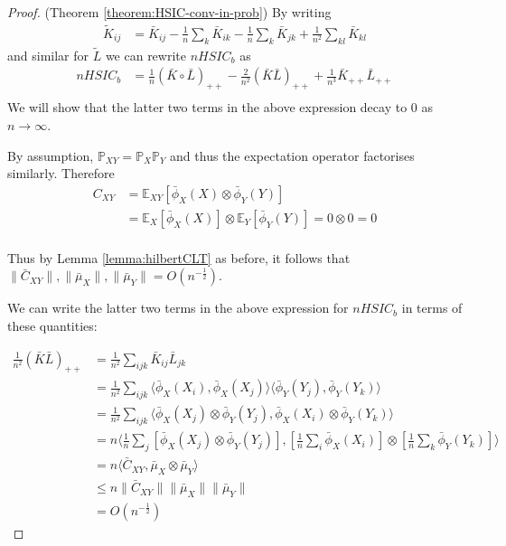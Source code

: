 \documentclass[]{article}
\begin{document}
\begin{proof}(Theorem \ref{theorem:HSIC-conv-in-prob})
By writing
\begin{align*}
\tilde{K}_{ij} &= \bar{K}_{ij} - \frac{1}{n}\sum_k\bar{K}_{ik} - \frac{1}{n}\sum_k\bar{K}_{jk} + \frac{1}{n^2}\sum_{kl}\bar{K}_{kl}
\end{align*} 
and similar for $\tilde{L}$ we can rewrite $nHSIC_b$ as 
\begin{align*}
nHSIC_b & = \frac{1}{n} (\bar{K}\circ \bar{L})_{++}  - \frac{2}{n^2}(\bar{K}\bar{L})_{++} + \frac{1}{n^3}\bar{K}_{++}\bar{L}_{++} \\
\end{align*}
We will show that the latter two terms in the above expression decay to 0 as $n\longrightarrow\infty$. 

By assumption, $\mathbb{P}_{XY} = \mathbb{P}_X\mathbb{P}_Y$ and thus the expectation operator factorises similarly. Therefore 
\begin{align*}
C_{XY} & = \mathbb{E}_{XY}[\bar{\phi}_X(X)\otimes\bar{\phi}_Y(Y)] \\
& = \mathbb{E}_{X}[\bar{\phi}_X(X)]\otimes\mathbb{E}_Y[\bar{\phi}_Y(Y)] = 0\otimes 0 = 0\\
\end{align*}

Thus by Lemma \ref{lemma:hilbertCLT} as before, it follows that $\|\bar{C}_{XY}\|, \|\bar{\mu}_X\|, \|\bar{\mu}_Y\| = O(n^{-\frac{1}{2}})$. 

We can write the latter two terms in the above expression for $nHSIC_b$ in terms of these quantities:

\begin{align*}
\frac{1}{n^2}(\bar{K}\bar{L})_{++} &= \frac{1}{n^2} \sum_{ijk}\bar{K}_{ij}\bar{L}_{jk}\\
&= \frac{1}{n^2} \sum_{ijk}\langle \bar{\phi}_X(X_i),\bar{\phi}_X(X_j) \rangle \langle \bar{\phi}_Y(Y_j),\bar{\phi}_Y(Y_k)\rangle \\&=
\frac{1}{n^2} \sum_{ijk}\langle \bar{\phi}_X(X_j)\otimes\bar{\phi}_Y(Y_j),
\bar{\phi}_X(X_i)\otimes\bar{\phi}_Y(Y_k)\rangle \\&=
n\langle \frac{1}{n} \sum_{j}[\bar{\phi}_X(X_j)\otimes\bar{\phi}_Y(Y_j)],
[\frac{1}{n} \sum_{i}\bar{\phi}_X(X_i)]\otimes[\frac{1}{n} \sum_{k}\bar{\phi}_Y(Y_k)]\rangle \\&=
n\langle \bar{C}_{XY},\bar{\mu}_X  \otimes \bar{\mu}_Y \rangle \\ 
&\leq n \|\bar{C}_{XY}\|\|\bar{\mu}_X\| \| \bar{\mu}_Y\|\\
&= O(n^{-\frac{1}{2}})
\end{align*}


\end{proof}
\end{document}
